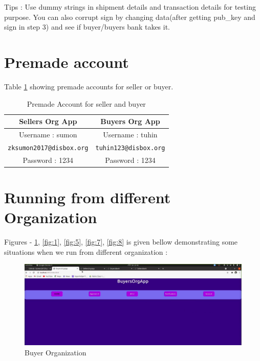 \documentclass[a4paper,12pt]{report}
\begin{document}
{\color{green}Tips :} Use dummy strings in shipment details and transaction details for testing purpose. You can also corrupt sign by changing data(after getting pub\_key and sign in step 3) and see if buyer/buyers bank takes it.



\section{Premade account}

Table \ref{tab:premade} showing premade accounts for seller or buyer.

\begin{table}[h]
    \centering
    \begin{tabular}{|c|c|}
    \hline
    \textbf{Sellers Org App}     &\textbf{Buyers Org App}  \\
    \hline
    Username : sumon     & Username : tuhin\\
    \hline
    \texttt{zksumon2017@disbox.org} & \texttt{tuhin123@disbox.org} \\
    \hline
    Password : 1234 & Password : 1234\\
    \hline
    \end{tabular}
    \caption{Premade Account for seller and buyer}
    \label{tab:premade}
\end{table}


\section{Running from different Organization}

Figures - \ref{fig:2}, \ref{fig:1}, \ref{fig:5}, \ref{fig:7}, \ref{fig:8} is given bellow demonstrating some situations when we run from different organization :

\vspace{20pt}

\begin{figure}[h]
    \centering
    \includegraphics[width=0.7\paperwidth]{2.pdf}
    \caption{Buyer Organization}
    \label{fig:2}
\end{figure}
\end{document}
